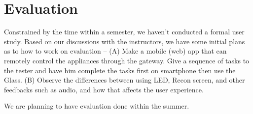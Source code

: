 \section{Evaluation}
\label{sec:evaluation}


Constrained by the time within a semester, we haven't conducted a formal user study. Based on our discussions with the instructors, we have some initial plans as to how to work on evaluation -- (A) Make a mobile (web) app that can remotely control the appliances through the gateway. Give a sequence of tasks to the tester and have him complete the tasks first on smartphone then use the Glass. (B) Observe the differences between using LED, Recon screen, and other feedbacks such as audio, and how that affects the user experience.

We are planning to have evaluation done within the summer.
